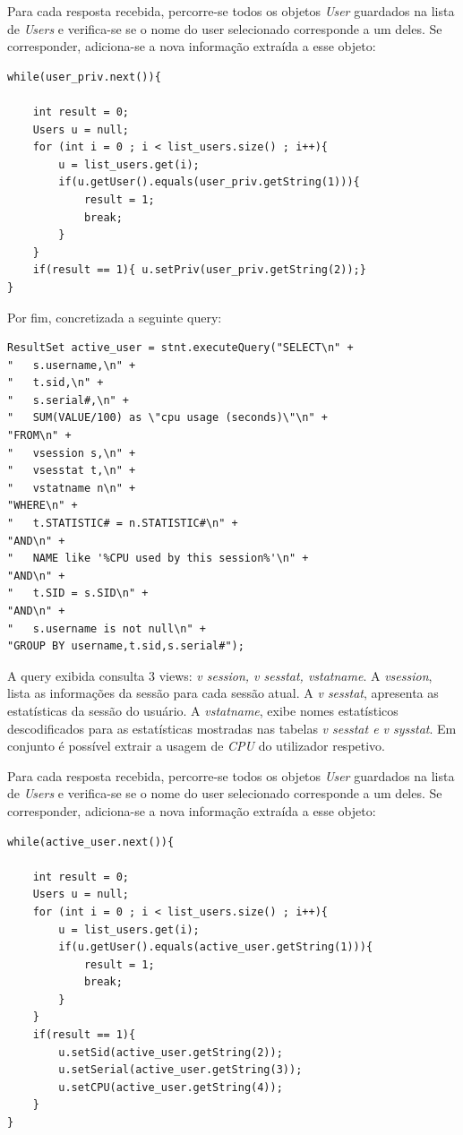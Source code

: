 Para cada resposta recebida, percorre-se todos os objetos \textit{User} guardados na lista de \textit{Users} e verifica-se se o nome do user selecionado corresponde a um deles. Se corresponder, adiciona-se a nova informação extraída a esse objeto:
\vspace{2mm}
\begin{lstlisting}
while(user_priv.next()){
             
    int result = 0;
    Users u = null;
    for (int i = 0 ; i < list_users.size() ; i++){
        u = list_users.get(i);
        if(u.getUser().equals(user_priv.getString(1))){
            result = 1;
            break;
        }
    }
    if(result == 1){ u.setPriv(user_priv.getString(2));}  
}
\end{lstlisting}
\vspace{2mm}
Por fim, concretizada a seguinte query:
\vspace{2mm}
\begin{lstlisting}
ResultSet active_user = stnt.executeQuery("SELECT\n" +
"   s.username,\n" +
"   t.sid,\n" +
"   s.serial#,\n" +
"   SUM(VALUE/100) as \"cpu usage (seconds)\"\n" +
"FROM\n" +
"   vsession s,\n" +
"   vsesstat t,\n" +
"   vstatname n\n" +
"WHERE\n" +
"   t.STATISTIC# = n.STATISTIC#\n" +
"AND\n" +
"   NAME like '%CPU used by this session%'\n" +
"AND\n" +
"   t.SID = s.SID\n" +
"AND\n" +
"   s.username is not null\n" +
"GROUP BY username,t.sid,s.serial#");
\end{lstlisting}
\vspace{2mm}
A query exibida consulta 3 views: \textit{v session, v sesstat, vstatname}. A \textit{vsession}, lista as informações da sessão para cada sessão atual. A \textit{v sesstat}, apresenta as estatísticas da sessão do usuário. A \textit{vstatname}, exibe nomes estatísticos descodificados para as estatísticas mostradas nas tabelas \textit{v sesstat e v sysstat}. Em conjunto é possível extrair a usagem de \textit{CPU} do utilizador respetivo.

Para cada resposta recebida, percorre-se todos os objetos \textit{User} guardados na lista de \textit{Users} e verifica-se se o nome do user selecionado corresponde a um deles. Se corresponder, adiciona-se a nova informação extraída a esse objeto:
\vspace{2mm}
\begin{lstlisting}
while(active_user.next()){
           
    int result = 0;
    Users u = null;
    for (int i = 0 ; i < list_users.size() ; i++){
        u = list_users.get(i);
        if(u.getUser().equals(active_user.getString(1))){
            result = 1;
            break;
        }
    }
    if(result == 1){
        u.setSid(active_user.getString(2));
        u.setSerial(active_user.getString(3));
        u.setCPU(active_user.getString(4));
    }    
}
\end{lstlisting}
\vspace{2mm}
